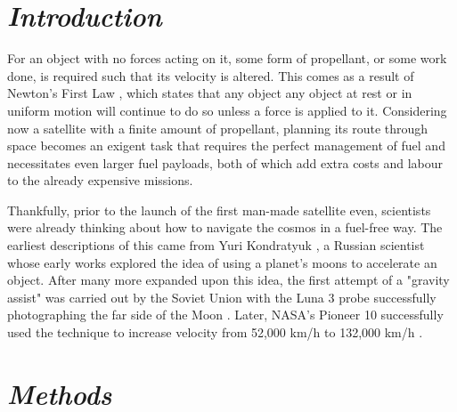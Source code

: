 \documentclass[12pt, english]{report}
\begin{document}
\tableofcontents

\clearpage

\setlength{\cftbeforeloftitleskip}{-22pt}
\renewcommand{\cftloftitlefont}{\hfill\huge\bfseries}
\renewcommand{\cftafterloftitle}{\hfill}
\listoffigures

\clearpage



\cleardoublepage

\chapter{\textsl{Introduction}}
\normalsize{\noindent For an object with no forces acting on it, some form of propellant, or some work done, is required such that its velocity is altered. This comes as a result of Newton's First Law \cite{newton_principia_1999}, which states that any object any object at rest or in uniform motion will continue to do so unless a force is applied to it. Considering now a satellite with a finite amount of propellant, planning its route through space becomes an exigent task that requires the perfect management of fuel and necessitates even larger fuel payloads, both of which add extra costs and labour to the already expensive missions.

Thankfully, prior to the launch of the first man-made satellite even, scientists were already thinking about how to navigate the cosmos in a fuel-free way. The earliest descriptions of this came from Yuri Kondratyuk \cite{noauthor_kondratuk_nodate}, a Russian scientist whose early works explored the idea of using a planet's moons to accelerate an object. After many more expanded upon this idea, the first attempt of a "gravity assist" was carried out by the Soviet Union with the Luna 3 probe successfully photographing the far side of the Moon \cite{noauthor_luna_nodate}. Later, NASA's Pioneer 10 successfully used the technique to increase velocity from 52,000 km/h to 132,000 km/h \cite{administrator_pioneer_2015}.}



%

\chapter{\textsl{Methods}}
\end{document}
